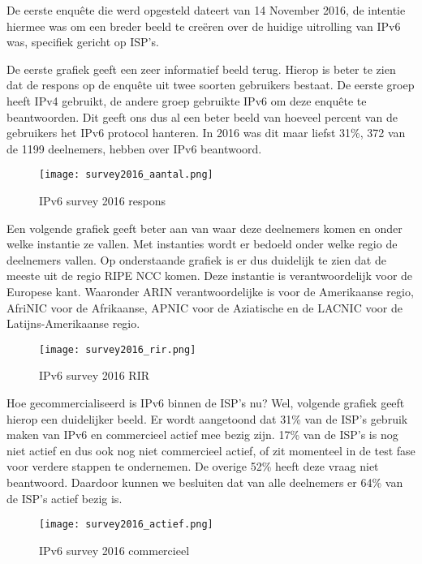 De eerste enquête die werd opgesteld dateert van 14 November 2016, de intentie hiermee was om een breder beeld te creëren over de huidige uitrolling van IPv6 was, specifiek gericht op ISP’s. 

De eerste grafiek geeft een zeer informatief beeld terug. Hierop is beter te zien dat de respons op de enquête uit twee soorten gebruikers bestaat. De eerste groep heeft IPv4 gebruikt, de andere groep gebruikte IPv6 om deze enquête te beantwoorden. Dit geeft ons dus al een beter beeld van hoeveel percent van de gebruikers het IPv6 protocol hanteren. In 2016 was dit maar liefst 31\%, 372 van de 1199 deelnemers, hebben over IPv6 beantwoord. 

\begin{figure}
\centering
\texttt{[image: survey2016\_aantal.png]}
\caption{IPv6 survey 2016 respons \autocite{Martinez2016}}
\end{figure}

Een volgende grafiek geeft beter aan van waar deze deelnemers komen en onder welke instantie ze vallen. Met instanties wordt er bedoeld onder welke regio de deelnemers vallen. Op onderstaande grafiek is er dus duidelijk te zien dat de meeste uit de regio RIPE NCC komen. Deze instantie is verantwoordelijk voor de Europese kant. Waaronder ARIN verantwoordelijke is voor de Amerikaanse regio, AfriNIC voor de Afrikaanse, APNIC voor de Aziatische en de LACNIC voor de Latijns-Amerikaanse regio.

\begin{figure}
\centering
\texttt{[image: survey2016\_rir.png]}
\caption{IPv6 survey 2016 RIR \autocite{Martinez2016}}
\end{figure}

Hoe gecommercialiseerd is IPv6 binnen de ISP’s nu? Wel, volgende grafiek geeft hierop een duidelijker beeld. Er wordt aangetoond dat 31\% van de ISP’s gebruik maken van IPv6 en commercieel actief mee bezig zijn. 17\% van de ISP’s is nog niet actief en dus ook nog niet commercieel actief, of zit momenteel in de test fase voor verdere stappen te ondernemen. De overige 52\% heeft deze vraag niet beantwoord. Daardoor kunnen we besluiten dat van alle deelnemers er 64\% van de ISP’s actief bezig is.

\begin{figure}
\centering
\texttt{[image: survey2016\_actief.png]}
\caption{IPv6 survey 2016 commercieel \autocite{Martinez2016}}
\end{figure}

